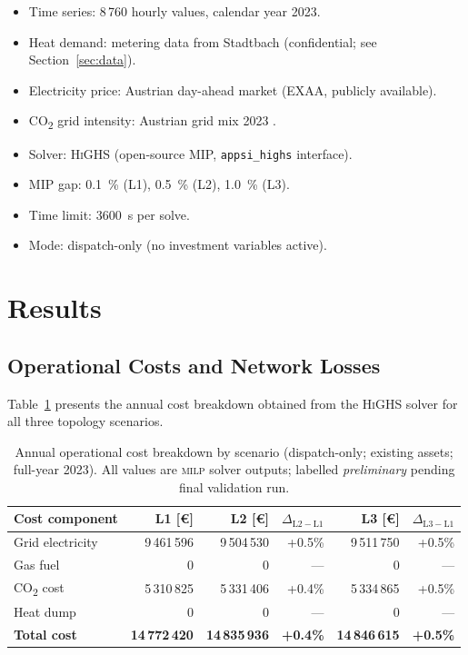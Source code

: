 \documentclass[a4paper,fleqn]{cas-sc}
\newcommand{\milp}{\textsc{milp}}
\newcommand{\highs}{\textsc{HiGHS}}
\begin{document}
\begin{itemize}
  \item Time series: 8\,760 hourly values, calendar year 2023.
  \item Heat demand: metering data from Stadtbach (confidential; see
        Section~\ref{sec:data}).
  \item Electricity price: Austrian day-ahead market (EXAA, publicly
        available).
  \item CO\textsubscript{2} grid intensity: Austrian grid mix 2023
        \cite{EControl2024}.
  \item Solver: \highs{} (open-source MIP, \texttt{appsi\_highs} interface).
  \item MIP gap: \SI{0.1}{\percent} (L1), \SI{0.5}{\percent} (L2),
        \SI{1.0}{\percent} (L3).
  \item Time limit: \SI{3600}{s} per solve.
  \item Mode: dispatch-only (no investment variables active).
\end{itemize}

\section{Results}
\label{sec:results}

\subsection{Operational Costs and Network Losses}

Table~\ref{tab:costs} presents the annual cost breakdown obtained from the
\highs{} solver for all three topology scenarios.

\begin{table}
\caption{Annual operational cost breakdown by scenario
         (dispatch-only; existing assets; full-year 2023).
         All values are \milp{} solver outputs; labelled
         \emph{preliminary} pending final validation run.}
\label{tab:costs}
\begin{tabularx}{\linewidth}{lrrrrr}
\toprule
Cost component
  & L1 [\euro{}]
  & L2 [\euro{}]
  & $\Delta_{\mathrm{L2-L1}}$
  & L3 [\euro{}]
  & $\Delta_{\mathrm{L3-L1}}$ \\
\midrule
Grid electricity   & 9\,461\,596 & 9\,504\,530 & +0.5\% & 9\,511\,750 & +0.5\% \\
Gas fuel           &           0 &           0 & ---    &           0 & ---    \\
CO\textsubscript{2} cost & 5\,310\,825 & 5\,331\,406 & +0.4\% & 5\,334\,865 & +0.5\% \\
Heat dump          &           0 &           0 & ---    &           0 & ---    \\
\midrule
\textbf{Total cost} & \textbf{14\,772\,420} & \textbf{14\,835\,936} & \textbf{+0.4\%} & \textbf{14\,846\,615} & \textbf{+0.5\%} \\
\bottomrule
\end{tabularx}
\end{table}
\end{document}
